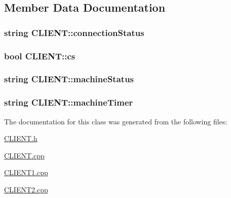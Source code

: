 \subsection{Member Data Documentation}
\hypertarget{classCLIENT_a750c6b410d6358c35e415031dfd350c8}{}
\subsubsection[{connection\+Status}]{\setlength{\rightskip}{0pt plus 5cm}string C\+L\+I\+E\+N\+T\+::connection\+Status\hspace{0.3cm}{\ttfamily [private]}}\label{classCLIENT_a750c6b410d6358c35e415031dfd350c8}
\hypertarget{classCLIENT_af7973e9a611e41850653f69b9e9e3e8f}{}
\subsubsection[{cs}]{\setlength{\rightskip}{0pt plus 5cm}bool C\+L\+I\+E\+N\+T\+::cs\hspace{0.3cm}{\ttfamily [private]}}\label{classCLIENT_af7973e9a611e41850653f69b9e9e3e8f}
\hypertarget{classCLIENT_a83578b8ade6203c7a78972b3393e923b}{}
\subsubsection[{machine\+Status}]{\setlength{\rightskip}{0pt plus 5cm}string C\+L\+I\+E\+N\+T\+::machine\+Status\hspace{0.3cm}{\ttfamily [private]}}\label{classCLIENT_a83578b8ade6203c7a78972b3393e923b}
\hypertarget{classCLIENT_a0474dbf26b3f3a99bf7579278453ef79}{}
\subsubsection[{machine\+Timer}]{\setlength{\rightskip}{0pt plus 5cm}string C\+L\+I\+E\+N\+T\+::machine\+Timer\hspace{0.3cm}{\ttfamily [private]}}\label{classCLIENT_a0474dbf26b3f3a99bf7579278453ef79}


The documentation for this class was generated from the following files\+:\begin{DoxyCompactItemize}
\item 
\hyperlink{CLIENT_8h}{C\+L\+I\+E\+N\+T.\+h}\item 
\hyperlink{CLIENT_8cpp}{C\+L\+I\+E\+N\+T.\+cpp}\item 
\hyperlink{CLIENT1_8cpp}{C\+L\+I\+E\+N\+T1.\+cpp}\item 
\hyperlink{CLIENT2_8cpp}{C\+L\+I\+E\+N\+T2.\+cpp}\end{DoxyCompactItemize}
